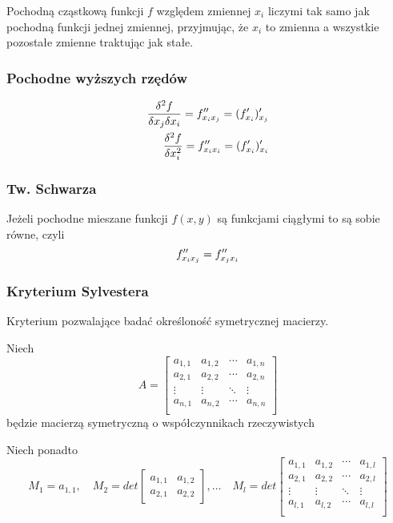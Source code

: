 \documentclass[../Matematyka.tex]{subfiles}
\begin{document}
    Pochodną cząstkową funkcji \(f\) względem zmiennej \(x_i\) liczymi tak samo jak pochodną funkcji jednej zmiennej, przyjmując, że \(x_i\) to zmienna a wszystkie pozostałe zmienne traktując jak stałe.

    \subsubsection*{Pochodne wyższych rzędów}
    \begin{align*}
        \frac{\delta^2f}{\delta x_j \delta x_i} = f^{\prime\prime}_{x_i x_j} = (f^\prime_{x_i})^\prime_{x_j} \\
        \frac{\delta^2f}{\delta x^2_i} = f^{\prime\prime}_{x_i x_i} = (f^\prime_{x_i})^\prime_{x_i}
    \end{align*}

    \subsubsection{Tw. Schwarza}
    Jeżeli pochodne mieszane funkcji \(f(x, y)\) są funkcjami ciągłymi to są sobie równe, czyli
    \[f^{\prime\prime}_{x_i x_j} = f^{\prime\prime}_{x_j x_i}\]

    \subsubsection{Kryterium Sylvestera}
    Kryterium pozwalające badać określoność symetrycznej macierzy.

    Niech
    \begin{displaymath}
        A = 
        \begin{bmatrix}
            a_{1,1} & a_{1,2} & \cdots & a_{1,n} \\
            a_{2,1} & a_{2,2} & \cdots & a_{2,n} \\
            \vdots & \vdots & \ddots & \vdots \\
            a_{n,1} & a_{n,2} & \cdots & a_{n,n} \\
        \end{bmatrix}
    \end{displaymath}
    będzie macierzą symetryczną o współczynnikach rzeczywistych

    Niech ponadto
    \begin{displaymath}
        M_1 = a_{1,1}, \quad 
        M_2 = det
        \begin{bmatrix}
            a_{1,1} & a_{1,2} \\
            a_{2,1} & a_{2,2}
        \end{bmatrix}, \dots \quad
        M_l = det
        \begin{bmatrix}
            a_{1,1} & a_{1,2} & \cdots & a_{1,l} \\
            a_{2,1} & a_{2,2} & \cdots & a_{2,l} \\
            \vdots & \vdots & \ddots & \vdots \\
            a_{l,1} & a_{l,2} & \cdots & a_{l,l} \\
        \end{bmatrix}
    \end{displaymath}
\end{document}
